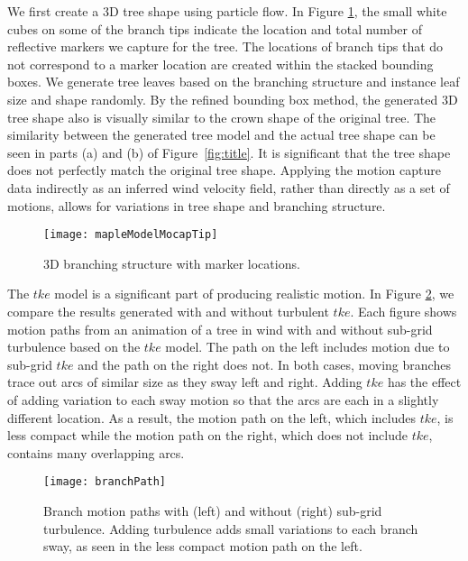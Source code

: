 We first create a 3D tree shape using particle flow. In Figure \ref{fig:treeshape}, the small white cubes on some of the branch tips indicate the location and total number of reflective markers we capture for the tree. The locations of branch tips that do not correspond to a marker location are created within the stacked bounding boxes. We generate tree leaves based on the branching structure and instance leaf size and shape randomly. By the refined bounding box method, the generated 3D tree shape also is visually similar to the crown shape of the original tree. The similarity between the generated tree model and the actual tree shape can be seen in parts (a) and (b) of Figure~\ref{fig:title}.  It is significant that the tree shape does not perfectly match the original tree shape.  Applying the motion capture data indirectly as an inferred wind velocity field, rather than directly as a set of motions, allows for variations in tree shape and branching structure.  

\begin{figure}[!t]
\centering
\texttt{[image: mapleModelMocapTip]}
\caption{3D branching structure with marker locations.}
\label{fig:treeshape}
\end{figure}

The $tke$ model is a significant part of producing realistic motion. In Figure \ref{fig:branchPath}, we compare the results generated with and without turbulent $tke$. Each figure shows motion paths from an animation of a tree in wind with and without sub-grid turbulence based on the $tke$ model.  The path on the left includes motion due to sub-grid $tke$ and the path on the right does not.  In both cases, moving branches trace out arcs of similar size as they sway left and right.  Adding $tke$ has the effect of adding variation to each sway motion so that the arcs are each in a slightly different location.  As a result, the motion path on the left, which includes $tke$, is less compact while the motion path on the right, which does not include $tke$, contains many overlapping arcs.

\begin{figure}[!t]
\centering
\texttt{[image: branchPath]}
\caption[Branch motion paths with and without subgrid turbulence.]{Branch motion paths with (left) and without (right) sub-grid turbulence. Adding turbulence adds small variations to each branch sway, as seen in the less compact motion path on the left.}
\label{fig:branchPath}
\end{figure}

